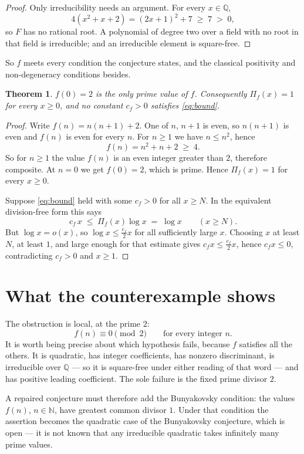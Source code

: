 \documentclass[11pt]{article}
\theoremstyle{plain}
\newtheorem{theorem}{Theorem}
\theoremstyle{remark}
\begin{document}
\begin{proof}
Only irreducibility needs an argument. For every $x\in\mathbb Q$,
\[
  4\left(x^2+x+2\right)=(2x+1)^2+7\;\ge\;7\;>\;0,
\]
so $F$ has no rational root. A polynomial of degree two over a field with no
root in that field is irreducible; and an irreducible element is square-free.
\end{proof}

So $f$ meets every condition the conjecture states, and the classical positivity
and non-degeneracy conditions besides.

\begin{theorem}\label{thm:main}
$f(0)=2$ is the only prime value of $f$. Consequently $\Pi_f(x)=1$ for every
$x\ge0$, and no constant $c_f>0$ satisfies \eqref{eq:bound}.
\end{theorem}

\begin{proof}
Write $f(n)=n(n+1)+2$. One of $n$, $n+1$ is even, so $n(n+1)$ is even and
$f(n)$ is even for every $n$. For $n\ge1$ we have $n\le n^2$, hence
\[
  f(n)=n^2+n+2\;\ge\;4 .
\]
So for $n\ge1$ the value $f(n)$ is an even integer greater than $2$, therefore
composite. At $n=0$ we get $f(0)=2$, which is prime. Hence
$\Pi_f(x)=1$ for every $x\ge0$.

Suppose \eqref{eq:bound} held with some $c_f>0$ for all $x\ge N$. In the
equivalent division-free form this says
\[
  c_f\,x\;\le\;\Pi_f(x)\log x\;=\;\log x
  \qquad (x\ge N).
\]
But $\log x=o(x)$, so $\log x\le\tfrac{c_f}2x$ for all sufficiently large $x$.
Choosing $x$ at least $N$, at least $1$, and large enough for that estimate
gives $c_f x\le\tfrac{c_f}2x$, hence $c_f x\le 0$, contradicting $c_f>0$ and
$x\ge1$.
\end{proof}

\section{What the counterexample shows}

The obstruction is local, at the prime $2$:
\[
  f(n)\equiv0\pmod2\qquad\text{for every integer }n .
\]
It is worth being precise about which hypothesis fails, because $f$ satisfies
all the others. It is quadratic, has integer coefficients, has nonzero
discriminant, is irreducible over $\mathbb Q$ --- so it is square-free under
either reading of that word --- and has positive leading coefficient. The sole
failure is the fixed prime divisor $2$.

A repaired conjecture must therefore add the Bunyakovsky condition: the values
$f(n)$, $n\in\mathbb N$, have greatest common divisor $1$. Under that condition
the assertion becomes the quadratic case of the Bunyakovsky conjecture, which
is open --- it is not known that any irreducible quadratic takes infinitely
many prime values.
\end{document}
